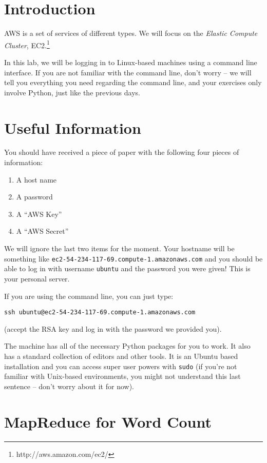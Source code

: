 \section{Introduction}

AWS is a set of services of different types. We will focus on the \emph{Elastic
Compute Cluster}, EC2.\footnote{http://aws.amazon.com/ec2/}

In this lab, we will be logging in to Linux-based machines using a command line
interface. If you are not familiar with the command line, don't worry -- we
will tell you everything you need regarding the command line, and your
exercises only involve Python, just like the previous days.

\section{Useful Information}

You should have received a piece of paper with the following four pieces of
information:

\begin{enumerate}
\item A host name
\item A password
\item A ``AWS Key''
\item A ``AWS Secret''
\end{enumerate}

We will ignore the last two items for the moment.  Your hostname will be
something like \texttt{ec2-54-234-117-69.compute-1.amazonaws.com} and you
should be able to log in with username \texttt{ubuntu} and the password you
were given! This is your personal server.

If you are using the command line, you can just type:

\begin{verbatim}
ssh ubuntu@ec2-54-234-117-69.compute-1.amazonaws.com
\end{verbatim}

(accept the RSA key and log in with the password we provided you).

The machine has all of the necessary Python packages for you to work. It also
has a standard collection of editors and other tools. It is an Ubuntu based
installation and you can access super user powers with \texttt{sudo} (if you're
not familiar with Unix-based environments, you might not understand this last
sentence -- don't worry about it for now).

\section{MapReduce for Word Count}

